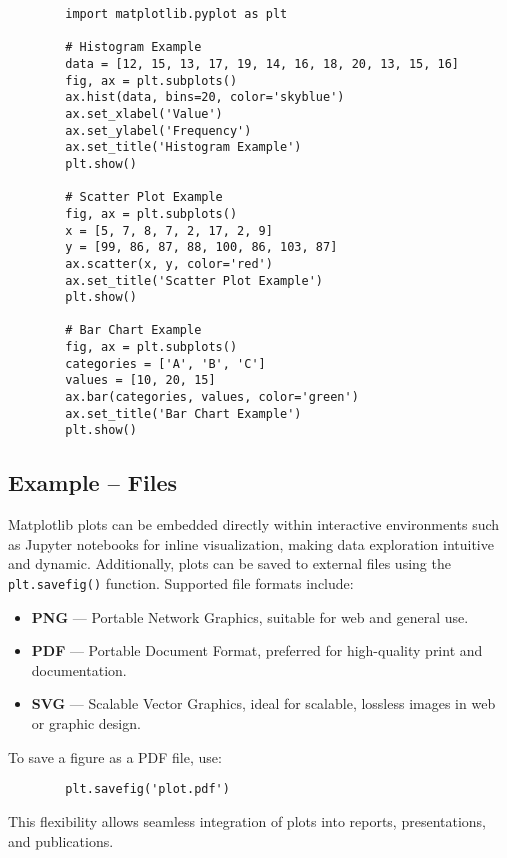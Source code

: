 \begin{framed}
	\begin{verbatim}
		import matplotlib.pyplot as plt
		
		# Histogram Example
		data = [12, 15, 13, 17, 19, 14, 16, 18, 20, 13, 15, 16]
		fig, ax = plt.subplots()
		ax.hist(data, bins=20, color='skyblue')
		ax.set_xlabel('Value')
		ax.set_ylabel('Frequency')
		ax.set_title('Histogram Example')
		plt.show()
		
		# Scatter Plot Example
		fig, ax = plt.subplots()
		x = [5, 7, 8, 7, 2, 17, 2, 9]
		y = [99, 86, 87, 88, 100, 86, 103, 87]
		ax.scatter(x, y, color='red')
		ax.set_title('Scatter Plot Example')
		plt.show()
		
		# Bar Chart Example
		fig, ax = plt.subplots()
		categories = ['A', 'B', 'C']
		values = [10, 20, 15]
		ax.bar(categories, values, color='green')
		ax.set_title('Bar Chart Example')
		plt.show()
	\end{verbatim}
\end{framed}


\subsection{Example -- Files}
Matplotlib plots can be embedded directly within interactive environments such as Jupyter notebooks for inline visualization, making data exploration intuitive and dynamic. Additionally, plots can be saved to external files using the \texttt{plt.savefig()} function. Supported file formats include:

\begin{itemize}
	\item \textbf{PNG} — Portable Network Graphics, suitable for web and general use.
	\item \textbf{PDF} — Portable Document Format, preferred for high-quality print and documentation.
	\item \textbf{SVG} — Scalable Vector Graphics, ideal for scalable, lossless images in web or graphic design.
\end{itemize}

To save a figure as a PDF file, use:

\begin{framed}
	\begin{verbatim}
		plt.savefig('plot.pdf')
	\end{verbatim}
\end{framed}

This flexibility allows seamless integration of plots into reports, presentations, and publications.

